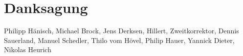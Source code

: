 \chapter*{Danksagung}
\label{sec:danksagung}
Philipp Hänisch, Michael Brock, Jens Derksen, Hillert, Zweitkorrektor, Dennis Sauerland, Manuel Schedler, Thilo vom Hövel, Philip Hauer, Yannick Dieter, Nikolas Heurich
